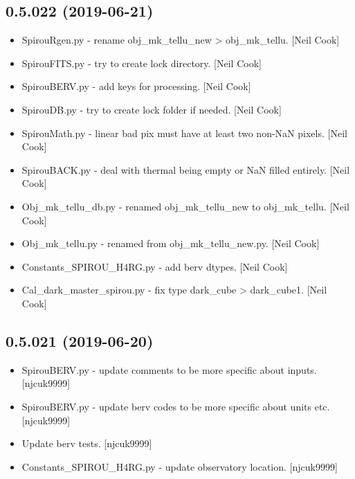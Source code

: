 \documentclass[a4paper,10pt,english]{report}
\begin{document}
\subsection{0.5.022 (2019-06-21)}
\label{\detokenize{misc/changelog:id113}}\begin{itemize}
\item {} 
SpirouRgen.py - rename obj\_mk\_tellu\_new \textendash{}\textgreater{} obj\_mk\_tellu. {[}Neil Cook{]}

\item {} 
SpirouFITS.py - try to create lock directory. {[}Neil Cook{]}

\item {} 
SpirouBERV.py - add keys for processing. {[}Neil Cook{]}

\item {} 
SpirouDB.py - try to create lock folder if needed. {[}Neil Cook{]}

\item {} 
SpirouMath.py - linear bad pix must have at least two non-NaN pixels.
{[}Neil Cook{]}

\item {} 
SpirouBACK.py - deal with thermal being empty or NaN filled entirely.
{[}Neil Cook{]}

\item {} 
Obj\_mk\_tellu\_db.py - renamed obj\_mk\_tellu\_new to obj\_mk\_tellu. {[}Neil
Cook{]}

\item {} 
Obj\_mk\_tellu.py - renamed from obj\_mk\_tellu\_new.py. {[}Neil Cook{]}

\item {} 
Constants\_SPIROU\_H4RG.py - add berv dtypes. {[}Neil Cook{]}

\item {} 
Cal\_dark\_master\_spirou.py - fix type dark\_cube \textendash{}\textgreater{} dark\_cube1. {[}Neil
Cook{]}

\end{itemize}


\subsection{0.5.021 (2019-06-20)}
\label{\detokenize{misc/changelog:id114}}\begin{itemize}
\item {} 
SpirouBERV.py - update comments to be more specific about inputs.
{[}njcuk9999{]}

\item {} 
SpirouBERV.py - update berv codes to be more specific about units etc.
{[}njcuk9999{]}

\item {} 
Update berv tests. {[}njcuk9999{]}

\item {} 
Constants\_SPIROU\_H4RG.py - update observatory location. {[}njcuk9999{]}

\end{itemize}
\end{document}
